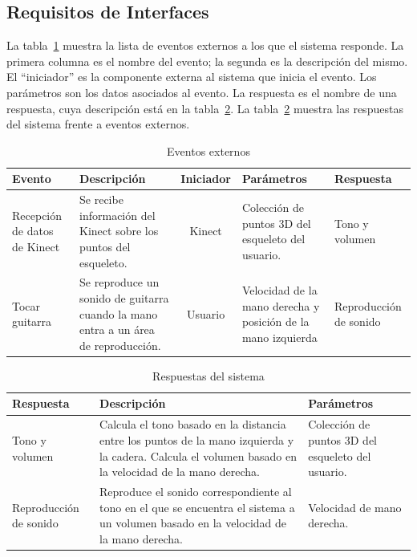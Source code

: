 \documentclass[a4paper,12pt]{article}
\begin{document}
\subsection{Requisitos de Interfaces}
La tabla~\ref{tab:event} muestra la lista de eventos externos a los que el sistema responde.
La primera columna es el nombre del evento; la segunda es la descripción del
mismo. El “iniciador” es la componente externa al sistema que inicia el evento.
Los parámetros son los datos asociados al evento. La respuesta es el nombre de
una respuesta, cuya descripción está en la tabla~\ref{tab:respuesta}.
La tabla~\ref{tab:respuesta} muestra las respuestas del sistema frente a eventos externos.
\begin{table}[hb]
        \centering
        \begin{tabular}{|p{2cm}|p{4cm}|c|p{3cm}|p{25mm}|}
                \hline
                \textbf{Evento} & \textbf{Descripción} & \textbf{Iniciador} &
                \textbf{Parámetros} & \textbf{Respuesta} \\
                \hline
                Recepción de datos de Kinect & Se recibe información del
                Kinect sobre los puntos del esqueleto. & Kinect & Colección
                de puntos 3D del esqueleto del usuario. & Tono y volumen \\
                \hline
                Tocar guitarra & Se reproduce un sonido de guitarra cuando la
                mano entra a un área de reproducción. & Usuario & Velocidad de
                la mano derecha y posición de la mano izquierda & Reproducción
                de sonido \\
                \hline
        \end{tabular}
        \caption{Eventos externos}
        \label{tab:event}
\end{table}

\begin{table}[h!]
        \centering
        \begin{tabular}{|p{3cm}|p{6cm}|p{4cm}|}
                \hline
                \textbf{Respuesta} & \textbf{Descripción} & \textbf{Parámetros} \\
                \hline
                Tono y volumen & Calcula el tono basado en la distancia entre
                los puntos de la mano izquierda y la cadera. Calcula el volumen
                basado en la velocidad de la mano derecha. & Colección de
                puntos 3D del esqueleto del usuario. \\
                \hline
                Reproducción de sonido & Reproduce el sonido correspondiente al
                tono en el que se encuentra el sistema a un volumen basado en
                la velocidad de la mano derecha. & Velocidad de mano derecha. \\
                \hline
        \end{tabular}
        \caption{Respuestas del sistema}
        \label{tab:respuesta}
\end{table}
\end{document}
